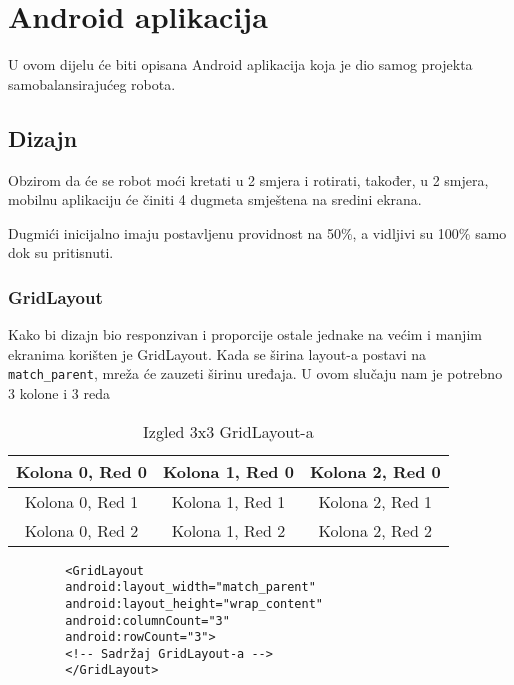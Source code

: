 \documentclass[../Document.tex]{subfiles}
\begin{document}
\section{Android aplikacija}
U ovom dijelu će biti opisana Android aplikacija koja je dio samog projekta samobalansirajućeg robota.

\subsection{Dizajn}
Obzirom da će se robot moći kretati u 2 smjera i rotirati, također, u 2 smjera, mobilnu aplikaciju će činiti 4 dugmeta smještena na sredini ekrana.


\noindent Dugmići inicijalno imaju postavljenu providnost na 50\%, a vidljivi su 100\% samo dok su pritisnuti.

\subsubsection{GridLayout}
Kako bi dizajn bio responzivan i proporcije ostale jednake na većim i manjim ekranima korišten je GridLayout. Kada se širina layout-a postavi na \verb|match_parent|, mreža će zauzeti širinu uređaja. U ovom slučaju nam je potrebno 3 kolone i 3 reda

\begin{table}[h]
    \centering
    \def\arraystretch{2}
    \begin{tabular}{ |c|c|c| }
        \hline
        Kolona 0, Red 0 & Kolona 1, Red 0 & Kolona 2, Red 0 \\
        \hline
        Kolona 0, Red 1 & Kolona 1, Red 1 & Kolona 2, Red 1 \\
        \hline
        Kolona 0, Red 2 & Kolona 1, Red 2 & Kolona 2, Red 2 \\
        \hline
    \end{tabular}
    \caption{Izgled 3x3 GridLayout-a}
\end{table}

\begin{code}
    \begin{verbatim}
        <GridLayout
        android:layout_width="match_parent"
        android:layout_height="wrap_content"
        android:columnCount="3"
        android:rowCount="3">
        <!-- Sadržaj GridLayout-a -->
        </GridLayout>
    \end{verbatim}
    \caption{GridLayout}
\end{code}
\end{document}
